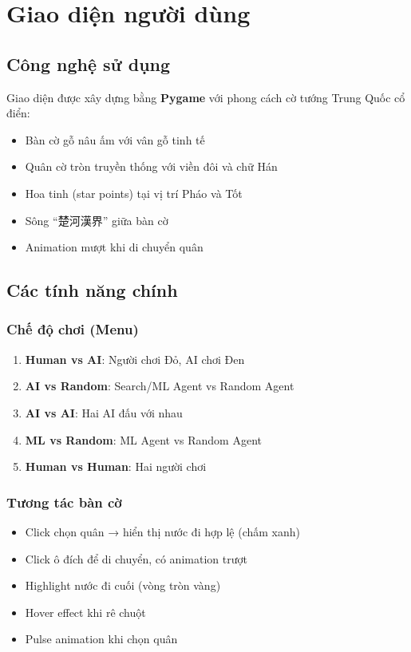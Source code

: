 \section{Giao diện người dùng}

\subsection{Công nghệ sử dụng}
Giao diện được xây dựng bằng \textbf{Pygame} với phong cách cờ tướng Trung Quốc cổ điển:
\begin{itemize}
    \item Bàn cờ gỗ nâu ấm với vân gỗ tinh tế
    \item Quân cờ tròn truyền thống với viền đôi và chữ Hán
    \item Hoa tinh (star points) tại vị trí Pháo và Tốt
    \item Sông ``楚河漢界'' giữa bàn cờ
    \item Animation mượt khi di chuyển quân
\end{itemize}

\subsection{Các tính năng chính}

\subsubsection{Chế độ chơi (Menu)}
\begin{enumerate}
    \item \textbf{Human vs AI}: Người chơi Đỏ, AI chơi Đen
    \item \textbf{AI vs Random}: Search/ML Agent vs Random Agent
    \item \textbf{AI vs AI}: Hai AI đấu với nhau
    \item \textbf{ML vs Random}: ML Agent vs Random Agent
    \item \textbf{Human vs Human}: Hai người chơi
\end{enumerate}

\subsubsection{Tương tác bàn cờ}
\begin{itemize}
    \item Click chọn quân → hiển thị nước đi hợp lệ (chấm xanh)
    \item Click ô đích để di chuyển, có animation trượt
    \item Highlight nước đi cuối (vòng tròn vàng)
    \item Hover effect khi rê chuột
    \item Pulse animation khi chọn quân
\end{itemize}

